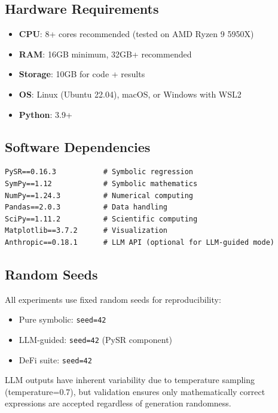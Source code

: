 \documentclass[twoside,11pt]{article}
\begin{document}
\subsection{Hardware Requirements}

\begin{itemize}
\item \textbf{CPU}: 8+ cores recommended (tested on AMD Ryzen 9 5950X)
\item \textbf{RAM}: 16GB minimum, 32GB+ recommended
\item \textbf{Storage}: 10GB for code + results
\item \textbf{OS}: Linux (Ubuntu 22.04), macOS, or Windows with WSL2
\item \textbf{Python}: 3.9+
\end{itemize}

\subsection{Software Dependencies}

\begin{small}
\begin{verbatim}
PySR==0.16.3           # Symbolic regression
SymPy==1.12            # Symbolic mathematics
NumPy==1.24.3          # Numerical computing
Pandas==2.0.3          # Data handling
SciPy==1.11.2          # Scientific computing
Matplotlib==3.7.2      # Visualization
Anthropic==0.18.1      # LLM API (optional for LLM-guided mode)
\end{verbatim}
\end{small}

\subsection{Random Seeds}

All experiments use fixed random seeds for reproducibility:

\begin{itemize}
\item Pure symbolic: \texttt{seed=42}
\item LLM-guided: \texttt{seed=42} (PySR component)
\item DeFi suite: \texttt{seed=42}
\end{itemize}

LLM outputs have inherent variability due to temperature sampling (temperature=0.7), but validation ensures only mathematically correct expressions are accepted regardless of generation randomness.
\end{document}
